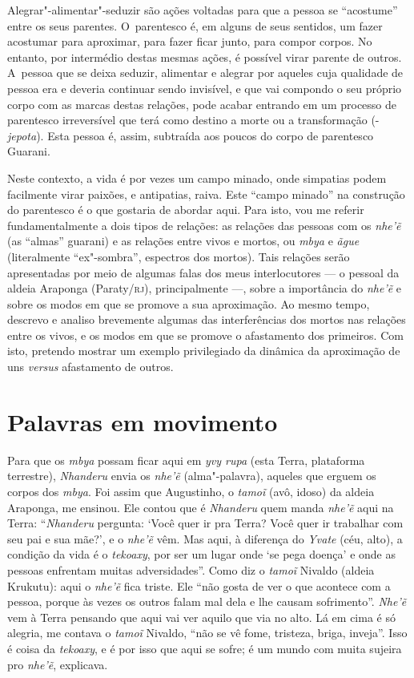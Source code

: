 Alegrar"-alimentar"-seduzir são ações voltadas para que a pessoa se
``acostume'' entre os seus parentes. O~parentesco é, em alguns de seus
sentidos, um fazer acostumar para aproximar, para fazer ficar junto,
para compor corpos. No entanto, por intermédio destas mesmas ações, é
possível virar parente de outros. A~pessoa que se deixa seduzir,
alimentar e alegrar por aqueles cuja qualidade de pessoa era e deveria
continuar sendo invisível, e que vai compondo o seu próprio corpo com
as marcas destas relações, pode acabar entrando em um processo de
parentesco irreversível que terá como destino a morte ou a
transformação (-\emph{jepota}). Esta pessoa é, assim, subtraída aos poucos do
corpo de parentesco Guarani.

Neste contexto, a vida é por vezes um campo minado, onde simpatias podem
facilmente virar paixões, e antipatias, raiva. Este ``campo minado'' na
construção do parentesco é o que gostaria de abordar aqui. Para isto,
vou me referir fundamentalmente a dois tipos de relações: as relações
das pessoas com os \emph{nhe’ẽ} (as ``almas'' guarani) e as relações entre
vivos e mortos, ou \emph{mbya} e \emph{ãgue} (literalmente ``ex"-sombra'', espectros dos
mortos). Tais relações serão apresentadas por meio de algumas falas dos
meus interlocutores --- o pessoal da aldeia Araponga (Paraty/\textsc{rj}),
principalmente ---, sobre a importância do \emph{nhe’ẽ} e sobre os modos
em que se promove a sua aproximação. Ao mesmo tempo, descrevo e analiso
brevemente algumas das interferências dos mortos nas relações entre os
vivos, e os modos em que se promove o afastamento dos primeiros. Com
isto, pretendo mostrar um exemplo privilegiado da dinâmica da
aproximação de uns \emph{versus} afastamento de outros.

\section{Palavras em movimento}

Para que os \emph{mbya} possam ficar aqui em \emph{yvy rupa} (esta Terra, plataforma
terrestre), \emph{Nhanderu} envia os \emph{nhe’ẽ} (alma"-palavra), aqueles que
erguem os corpos dos \emph{mbya}. Foi assim que Augustinho, o \emph{tamoĩ} (avô,
idoso) da aldeia Araponga, me ensinou. Ele contou que é \emph{Nhanderu} quem
manda \emph{nhe’ẽ} aqui na Terra: ``\emph{Nhanderu} pergunta: ‘Você quer ir pra
Terra? Você quer ir trabalhar com seu pai e sua mãe?’, e o \emph{nhe’ẽ}
vêm. Mas aqui, à diferença do \emph{Yvate} (céu, alto), a condição da vida é o
\emph{tekoaxy}, por ser um lugar onde `se pega doença' e onde as pessoas
enfrentam muitas adversidades''. Como diz o \emph{tamoĩ} Nivaldo (aldeia
Krukutu): aqui o \emph{nhe’ẽ} fica triste. Ele ``não gosta de ver o que
acontece com a pessoa, porque às vezes os outros falam mal dela e lhe
causam sofrimento''. \emph{Nhe’ẽ} vem à Terra pensando que aqui vai ver
aquilo que via no alto. Lá em cima é só
alegria, me contava o \emph{tamoĩ} Nivaldo, ``não se vê
fome, tristeza, briga, inveja''. Isso é coisa da \emph{tekoaxy}, e é por isso
que aqui se sofre; é um mundo com muita sujeira pro
\emph{nhe’ẽ}, explicava. 

